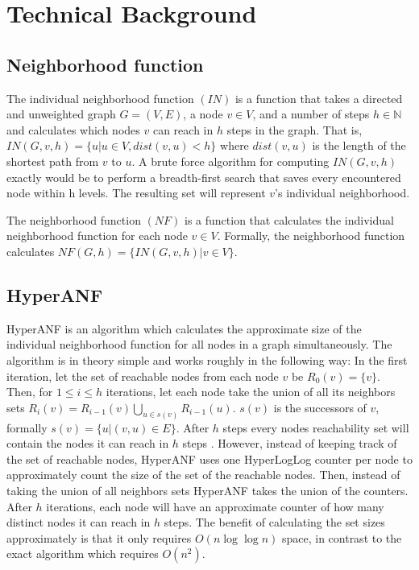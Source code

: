 \chapter{Technical Background}

\section{Neighborhood function}
The individual neighborhood function $(IN)$ is a function that takes a directed and unweighted graph $G = (V,E)$, a node $v \in V$, and a number of steps $h \in \mathbb{N}$ and calculates which nodes $v$ can reach in $h$ steps in the graph. That is, $IN(G,v,h) = \{u | u \in V, dist(v,u) < h\}$ where $dist(v,u)$ is the length of the shortest path from $v$ to $u$. A brute force algorithm for computing $IN(G,v,h)$ exactly would be to perform a breadth-first search that saves every encountered node within h levels. The resulting set will represent $v$'s individual neighborhood.

The neighborhood function $(NF)$ is a function that calculates the individual neighborhood function for each node $v \in V$. Formally, the neighborhood function calculates $NF(G,h) = \{ IN(G,v,h) | v \in V \}$.

\section{HyperANF}
HyperANF is an algorithm which calculates the approximate size of the individual neighborhood function for all nodes in a graph simultaneously. The algorithm is in theory simple and works roughly in the following way: In the first iteration, let the set of reachable nodes from each node $v$ be $R_0(v) = \{v\}$. Then, for $1 \leq i \leq h$ iterations, let each node take the union of all its neighbors sets $R_i(v) = R_{i-1}(v) \bigcup\limits_{u \in s(v)} R_{i-1}(u) $. $s(v)$ is the successors of $v$, formally $s(v) = \{u | (v,u) \in E\}$. After $h$ steps every nodes reachability set will contain the nodes it can reach in $h$ steps \cite{hyperball}. However, instead of keeping track of the set of reachable nodes, HyperANF uses one HyperLogLog counter per node to approximately count the size of the set of the reachable nodes. Then, instead of taking the union of all neighbors sets HyperANF takes the union of the counters. After $h$ iterations, each node will have an approximate counter of how many distinct nodes it can reach in $h$ steps. The benefit of calculating the set sizes approximately is that it only requires $O(n\log\log n)$ space, in contrast to the exact algorithm which requires $O(n^2)$.

